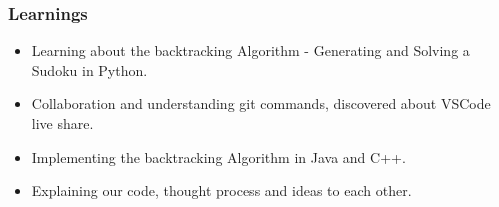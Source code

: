 \documentclass{beamer}
\begin{document}
\begin{frame}
     \frametitle{Learnings}
     \begin{itemize}
     \item Learning about the backtracking Algorithm -  Generating and Solving a Sudoku in Python.
     \item Collaboration and understanding git commands, discovered about VSCode live share.
	 \item Implementing the backtracking Algorithm in Java and C++.
	 \item Explaining our code, thought process and ideas to each other.
\end{itemize}         
\end{frame}
\end{document}

